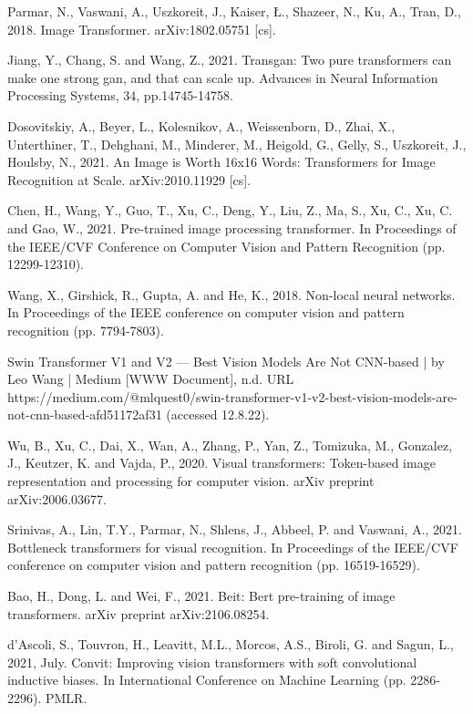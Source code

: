 \begin{thebibliography}{ widest-label }
	Parmar, N., Vaswani, A., Uszkoreit, J., Kaiser, Ł., Shazeer, N., Ku, A., Tran, D., 2018. Image Transformer. arXiv:1802.05751 [cs].
	
	Jiang, Y., Chang, S. and Wang, Z., 2021. Transgan: Two pure transformers can make one strong gan, and that can scale up. Advances in Neural Information Processing Systems, 34, pp.14745-14758.
	
	Dosovitskiy, A., Beyer, L., Kolesnikov, A., Weissenborn, D., Zhai, X., Unterthiner, T., Dehghani, M., Minderer, M., Heigold, G., Gelly, S., Uszkoreit, J., Houlsby, N., 2021. An Image is Worth 16x16 Words: Transformers for Image Recognition at Scale. arXiv:2010.11929 [cs].
	
	Chen, H., Wang, Y., Guo, T., Xu, C., Deng, Y., Liu, Z., Ma, S., Xu, C., Xu, C. and Gao, W., 2021. Pre-trained image processing transformer. In Proceedings of the IEEE/CVF Conference on Computer Vision and Pattern Recognition (pp. 12299-12310).
	
	Wang, X., Girshick, R., Gupta, A. and He, K., 2018. Non-local neural networks. In Proceedings of the IEEE conference on computer vision and pattern recognition (pp. 7794-7803).
	
	Swin Transformer V1 and V2 — Best Vision Models Are Not CNN-based | by Leo Wang | Medium [WWW Document], n.d. URL https://medium.com/@mlquest0/swin-transformer-v1-v2-best-vision-models-are-not-cnn-based-afd51172af31 (accessed 12.8.22).
	
	Wu, B., Xu, C., Dai, X., Wan, A., Zhang, P., Yan, Z., Tomizuka, M., Gonzalez, J., Keutzer, K. and Vajda, P., 2020. Visual transformers: Token-based image representation and processing for computer vision. arXiv preprint arXiv:2006.03677.
	
	Srinivas, A., Lin, T.Y., Parmar, N., Shlens, J., Abbeel, P. and Vaswani, A., 2021. Bottleneck transformers for visual recognition. In Proceedings of the IEEE/CVF conference on computer vision and pattern recognition (pp. 16519-16529).
	
	Bao, H., Dong, L. and Wei, F., 2021. Beit: Bert pre-training of image transformers. arXiv preprint arXiv:2106.08254.
	
	d’Ascoli, S., Touvron, H., Leavitt, M.L., Morcos, A.S., Biroli, G. and Sagun, L., 2021, July. Convit: Improving vision transformers with soft convolutional inductive biases. In International Conference on Machine Learning (pp. 2286-2296). PMLR.
	

\end{thebibliography}

